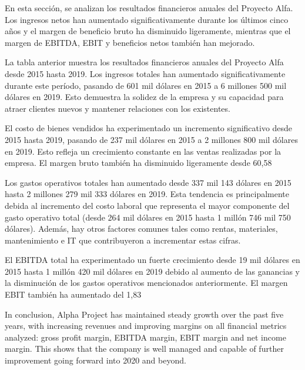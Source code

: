 
En esta sección, se analizan los resultados financieros anuales del Proyecto Alfa. Los ingresos netos han aumentado significativamente durante los últimos cinco años y el margen de beneficio bruto ha disminuido ligeramente, mientras que el margen de EBITDA, EBIT y beneficios netos también han mejorado.

                La tabla anterior muestra los resultados financieros anuales del Proyecto Alfa desde 2015 hasta 2019. Los ingresos totales han aumentado significativamente durante este período, pasando de 601 mil dólares en 2015 a 6 millones 500 mil dólares en 2019. Esto demuestra la solidez de la empresa y su capacidad para atraer clientes nuevos y mantener relaciones con los existentes.

                El costo de bienes vendidos ha experimentado un incremento significativo desde 2015 hasta 2019, pasando de 237 mil dólares en 2015 a 2 millones 800 mil dólares en 2019. Esto refleja un crecimiento constante en las ventas realizadas por la empresa. El margen bruto también ha disminuido ligeramente desde 60,58%

                Los gastos operativos totales han aumentado desde 337 mil 143 dólares en 2015 hasta 2 millones 279 mil 333 dólares en 2019. Esta tendencia es principalmente debida al incremento del costo laboral que representa el mayor componente del gasto operativo total (desde 264 mil dólares en 2015 hasta 1 millón 746 mil 750 dólares). Además, hay otros factores comunes tales como rentas, materiales, mantenimiento e IT que contribuyeron a incrementar estas cifras.

                El EBITDA total ha experimentado un fuerte crecimiento desde 19 mil dólares en 2015 hasta 1 millón 420 mil dólares en 2019 debido al aumento de las ganancias y la disminución de los gastos operativos mencionados anteriormente. El margen EBIT también ha aumentado del 1,83%

In conclusion, Alpha Project has maintained steady growth over the past five years, with increasing revenues and improving margins on all financial metrics analyzed: gross profit margin, EBITDA margin, EBIT margin and net income margin. This shows that the company is well managed and capable of further improvement going forward into 2020 and beyond.

